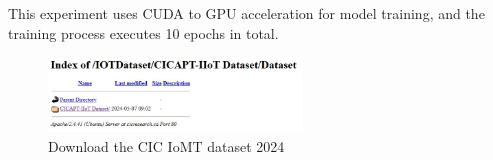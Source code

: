 \begin{ZhChapter}
    This experiment uses CUDA to GPU acceleration for model training, and the training process executes 10 epochs in total.
    \begin{figure}[!t]
        \centering
        \includegraphics[width = 0.6\textwidth]{image/Dataset.jpg}
        \caption{Download the CIC IoMT dataset 2024}
        \label{fig:D}
    \end{figure}



\end{ZhChapter}